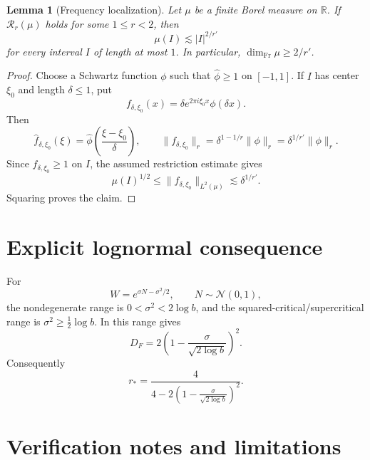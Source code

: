 \documentclass[11pt]{article}
\newtheorem{lemma}{Lemma}
\newcommand{\R}{\mathbb R}
\begin{document}
\begin{lemma}[Frequency localization]\label{lem:localization}
Let \(\mu\) be a finite Borel measure on \(\R\).  If
\(\mathcal R_r(\mu)\) holds for some \(1\leq r<2\), then
\[
 \mu(I)\lesssim |I|^{2/r'}
\]
for every interval \(I\) of length at most \(1\).  In particular,
\(\dim_{\mathrm{Fr}}\mu\geq2/r'\).
\end{lemma}

\begin{proof}
Choose a Schwartz function \(\phi\) such that
\(\widehat\phi\geq1\) on \([-1,1]\).  If \(I\) has center \(\xi_0\) and
length \(\delta\leq1\), put
\[
 f_{\delta,\xi_0}(x)
 =\delta e^{2\pi i\xi_0x}\phi(\delta x).
\]
Then
\[
 \widehat f_{\delta,\xi_0}(\xi)
 =\widehat\phi\left(\frac{\xi-\xi_0}{\delta}\right),
 \qquad
 \|f_{\delta,\xi_0}\|_r
 =\delta^{1-1/r}\|\phi\|_r
 =\delta^{1/r'}\|\phi\|_r.
\]
Since \(\widehat f_{\delta,\xi_0}\geq1\) on \(I\), the assumed restriction
estimate gives
\[
 \mu(I)^{1/2}
 \leq\|\widehat f_{\delta,\xi_0}\|_{L^2(\mu)}
 \lesssim\delta^{1/r'}.
\]
Squaring proves the claim.
\end{proof}

\section{Explicit lognormal consequence}

For
\[
 W=e^{\sigma N-\sigma^2/2},\qquad N\sim\mathcal N(0,1),
\]
the nondegenerate range is \(0<\sigma^2<2\log b\), and the
squared-critical/supercritical range is
\(\sigma^2\geq\tfrac12\log b\).  In this range \cite{CHQW} gives
\[
 D_F
 =2\left(1-\frac{\sigma}{\sqrt{2\log b}}\right)^2.
\]
Consequently
\[
 r_*
 =\frac{4}{
 4-2\left(1-\frac{\sigma}{\sqrt{2\log b}}\right)^2}.
\]

\section{Verification notes and limitations}
\end{document}
